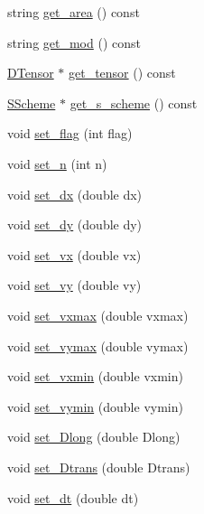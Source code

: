 \begin{DoxyCompactItemize}
\item 
string \hyperlink{class_simulation_parameters_a3e1410e837506a6d0f4225c5c224d260}{get\+\_\+area} () const 
\item 
string \hyperlink{class_simulation_parameters_acc53a811c1a21e0996a0fc044a6b7b3d}{get\+\_\+mod} () const 
\item 
\hyperlink{class_d_tensor}{D\+Tensor} $\ast$ \hyperlink{class_simulation_parameters_aaaba7d7f4d33a6f6fa13143979360d31}{get\+\_\+tensor} () const 
\item 
\hyperlink{class_s_scheme}{S\+Scheme} $\ast$ \hyperlink{class_simulation_parameters_a7b49731434f236aff3bf92e1ce4636e6}{get\+\_\+s\+\_\+scheme} () const 
\item 
void \hyperlink{class_simulation_parameters_a1c90f74ed579065b2785a6dc5d9c7645}{set\+\_\+flag} (int flag)
\item 
void \hyperlink{class_simulation_parameters_a310374d248e0fdc02c236936538d2f80}{set\+\_\+n} (int n)
\item 
void \hyperlink{class_simulation_parameters_ae06426aa1336727b706234b6bf0a9b2f}{set\+\_\+dx} (double dx)
\item 
void \hyperlink{class_simulation_parameters_a4ea672088cfe311f4fff6ef8fce7b4bb}{set\+\_\+dy} (double dy)
\item 
void \hyperlink{class_simulation_parameters_a85f6aea7fcbca0436594e6c73845aab8}{set\+\_\+vx} (double vx)
\item 
void \hyperlink{class_simulation_parameters_a569357bd6d6245684770a80501a45ac4}{set\+\_\+vy} (double vy)
\item 
void \hyperlink{class_simulation_parameters_a3d14efe09cd7ca79b44e12ee3fe8761c}{set\+\_\+vxmax} (double vxmax)
\item 
void \hyperlink{class_simulation_parameters_ad5df52a205d10f457e3500295884ab7e}{set\+\_\+vymax} (double vymax)
\item 
void \hyperlink{class_simulation_parameters_a31a365f0f5d131507ed2608acf8b5fd7}{set\+\_\+vxmin} (double vxmin)
\item 
void \hyperlink{class_simulation_parameters_a1e611a9995e5f7a38ad527c5e13507d9}{set\+\_\+vymin} (double vymin)
\item 
void \hyperlink{class_simulation_parameters_acd9d8da9786d6dce5b78ffcaedfe0a74}{set\+\_\+\+Dlong} (double Dlong)
\item 
void \hyperlink{class_simulation_parameters_a4cb8bab39bb4ba86b988edde543d97da}{set\+\_\+\+Dtrans} (double Dtrans)
\item 
void \hyperlink{class_simulation_parameters_ae2c2b65aff97393dbd1b685e598970fe}{set\+\_\+dt} (double dt)

\end{DoxyCompactItemize}
